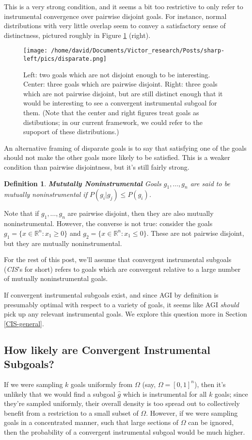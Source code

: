 \documentclass{article}
\newtheorem{definition}{Definition}
\begin{document}
This is a very strong condition, and it seems a bit too restrictive to only refer to instrumental convergence over pairwise disjoint goals. For instance, normal distributions with very little overlap seem to convey a satisfactory sense of distinctness, pictured roughly in Figure \ref{fig:disparate} (right).

\begin{figure}[ht]
    \centering
    \texttt{[image: /home/david/Documents/Victor\_research/Posts/sharp-left/pics/disparate.png]} 
    \caption{Left: two goals which are not disjoint enough to be interesting. Center: three goals which are pairwise disjoint. Right: three goals which are not pairwise disjoint, but are still distinct enough that it would be interesting to see a convergent instrumental subgoal for them. (Note that the center and right figures treat goals as distibutions; in our current framework, we could refer to the supoport of these distributions.)}
    \label{fig:disparate} 
\end{figure}

An alternative framing of disparate goals is to say that satisfying one of the goals should not make the other goals more likely to be satisfied. This is a weaker condition than pairwise disjointness, but it's still fairly strong.

\begin{definition}{\textbf{Mututally Noninstrumental}}
    Goals $g_1, \dots, g_n$ are said to be \emph{mutually noninstrumental} if $P(g_i|g_j)\le P(g_i)$.
\end{definition}

Note that if $g_1, \dots, g_n$ are pairwise disjoint, then they are also mutually noninstrumental. However, the converse is not true: consider the goals $g_1=\{x\in\mathbb{R}^n: x_1\ge 0\}$ and $g_2=\{x\in\mathbb{R}^n: x_1\le 0\}$. These are not pairwise disjoint, but they are mutually noninstrumental.

For the rest of this post, we'll assume that convergent instrumental subgoals (\emph{CIS}'s for short) refers to goals which are convergent relative to a large number of mutually noninstrumental goals. 

If convergent instrumental subgoals exist, and since AGI by definition is presumably optimal with respect to a variety of goals, it seems like AGI \emph{should} pick up any relevant instrumental goals. We explore this question more in Section \ref{CIS-general}.

\subsection{How likely are Convergent Instrumental Subgoals?}
If we were sampling $k$ goals uniformly from $\Omega$ (say, $\Omega=[0,1]^n$), then it's unlikely that we would find a subgoal $\hat{g}$ which is instrumental for all $k$ goals; since they're sampled uniformly, their overall density is too spread out to collectively benefit from a  restriction to a small subset of $\Omega$. However, if we were sampling goals in a concentrated manner, such that large sections of $\Omega$ can be ignored, then the probability of a convergent instrumental subgoal would be much higher.
\end{document}
